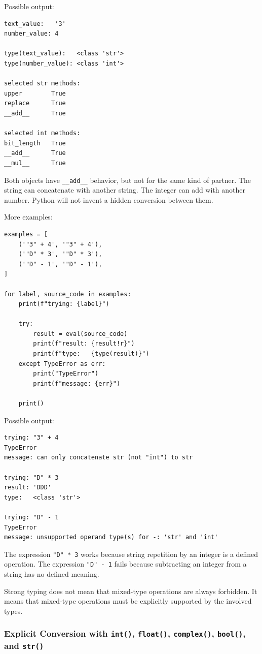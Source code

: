 Possible output:

\begin{verbatim}
text_value:   '3'
number_value: 4

type(text_value):   <class 'str'>
type(number_value): <class 'int'>

selected str methods:
upper        True
replace      True
__add__      True

selected int methods:
bit_length   True
__add__      True
__mul__      True
\end{verbatim}

Both objects have \texttt{\_\_add\_\_} behavior, but not for the same kind of partner. The string can concatenate with another string. The integer can add with another number. Python will not invent a hidden conversion between them.

More examples:

\begin{verbatim}
examples = [
    ('"3" + 4', '"3" + 4'),
    ('"D" * 3', '"D" * 3'),
    ('"D" - 1', '"D" - 1'),
]

for label, source_code in examples:
    print(f"trying: {label}")

    try:
        result = eval(source_code)
        print(f"result: {result!r}")
        print(f"type:   {type(result)}")
    except TypeError as err:
        print("TypeError")
        print(f"message: {err}")

    print()
\end{verbatim}

Possible output:

\begin{verbatim}
trying: "3" + 4
TypeError
message: can only concatenate str (not "int") to str

trying: "D" * 3
result: 'DDD'
type:   <class 'str'>

trying: "D" - 1
TypeError
message: unsupported operand type(s) for -: 'str' and 'int'
\end{verbatim}

The expression \texttt{"D" * 3} works because string repetition by an integer is a defined operation. The expression \texttt{"D" - 1} fails because subtracting an integer from a string has no defined meaning.

Strong typing does not mean that mixed-type operations are always forbidden. It means that mixed-type operations must be explicitly supported by the involved types.

\subsubsection{Explicit Conversion with \texttt{int()}, \texttt{float()}, \texttt{complex()}, \texttt{bool()}, and \texttt{str()}}

